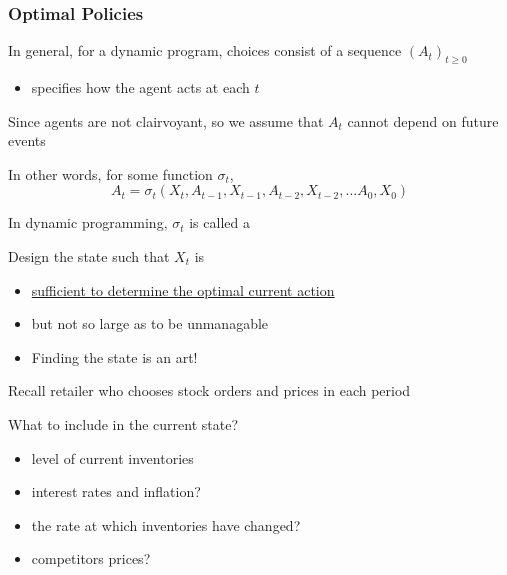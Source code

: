 \begin{frame}
    \frametitle{Optimal Policies}

    In general, for a dynamic program, choices consist of a sequence $(A_t)_{t
    \geq 0}$ 
    \begin{itemize}
        \item specifies how the agent acts at each $t$ 
    \end{itemize}


    Since agents are not clairvoyant, so we assume that $A_t$ cannot
    depend on future events

    In other words, for some function $\sigma_t$,
    \begin{equation*}
        A_t = \sigma_t(
                    X_t, A_{t-1}, X_{t-1}, A_{t-2}, X_{t-2}, \ldots
                    A_0, X_0)
    \end{equation*}

    In dynamic programming, $\sigma_t$ is called a 

\end{frame}


\begin{frame}

     Design the state such that $X_t$ is
    \begin{itemize}
        \item \underline{sufficient to determine the optimal current action}
        \item but not so large as to be unmanagable
    \end{itemize}

    \begin{itemize}
        \item Finding the state is an art!
    \end{itemize}
    
    \Eg Recall retailer who chooses stock orders and prices in each period

    What to include in the current state?

    \begin{itemize}
        \item level of current inventories 
        \item interest rates and inflation?
        \item the rate at which inventories have changed?
        \item competitors prices?
    \end{itemize}

\end{frame}



